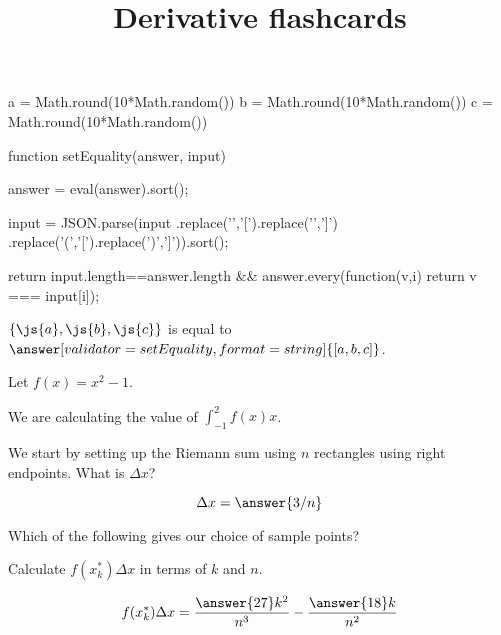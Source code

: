 \documentclass{ximera}
\title{Derivative flashcards}
\begin{document}
\begin{javascript}
  a = Math.round(10*Math.random())
  b = Math.round(10*Math.random())
  c = Math.round(10*Math.random())  

  function setEquality(answer, input) {
    answer = eval(answer).sort();
    
    input = JSON.parse(input
      .replace('{','[').replace('}',']')
      .replace('(','[').replace(')',']')).sort();
    
     return input.length==answer.length &&
       answer.every(function(v,i) { return v === input[i]});
   }

\end{javascript}

\begin{problem}
  $\{\js{a},\js{b},\js{c}\}$ is equal to $\answer[validator=setEquality,format=string]{[a,b,c]}$.
\end{problem}

\begin{exercise}
Let $f(x) = x^2-1$.

We are calculating the value of $\displaystyle \int_{-1}^{2} f(x)  x$.
 

We start by setting up the Riemann sum using $n$ rectangles using right endpoints.
What is $\Delta x$?
     
\[ \Delta x = \answer{3/n} \]

\begin{exercise}
  Which of the following gives our choice of sample points?
  \begin{multipleChoice}
  \end{multipleChoice}
  
  \begin{exercise}
    Calculate $f(x_k^*) \Delta x$ in terms of $k$ and $n$.
    
    \[ f(x_k^*) \Delta x = \frac{\answer{27}k^2}{n^3}-\frac{\answer{18}k}{n^2} \]
  \end{exercise}
\end{exercise}
\end{exercise}
\end{document}
